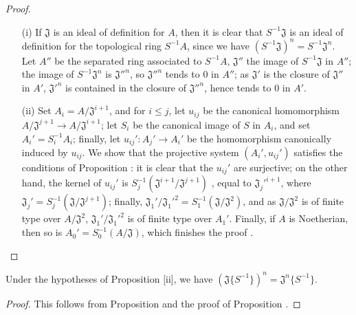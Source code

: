 \begin{proof}
\label{proof-7.6.11}
\medskip\noindent
\begin{enumerate}
  \item[(i)] If $\mathfrak{J}$ is an ideal of definition for $A$, then it is clear that
    $S^{-1}\mathfrak{J}$ is an ideal of definition for the topological ring $S^{-1}A$, since we
    have $(S^{-1}\mathfrak{J})^n=S^{-1}\mathfrak{J}^n$. Let $A''$ be the separated ring associated
    to $S^{-1}A$, $\mathfrak{J}''$ the image of $S^{-1}\mathfrak{J}$ in $A''$; the image of
    $S^{-1}\mathfrak{J}^n$ is ${\mathfrak{J}''}^n$, so ${\mathfrak{J}''}^n$ tends to $0$ in $A''$;
    as $\mathfrak{J}'$ is the closure of $\mathfrak{J}''$ in $A'$, ${\mathfrak{J}'}^n$ is contained
    in the closure of ${\mathfrak{J}''}^n$, hence tends to $0$ in $A'$.
  \item[(ii)] Set $A_i=A/\mathfrak{J}^{i+1}$, and for $i\leq j$, let $u_{ij}$ be the canonical
    homomorphism $A/\mathfrak{J}^{j+1}\to A/\mathfrak{J}^{i+1}$; let $S_i$ be the canonical image of
    $S$ in $A_i$, and set $A_i'=S_i^{-1}A_i$; finally, let $u_{ij}':A_j'\to A_i'$ be the homomorphism
    canonically induced by $u_{ij}$. We show that the projective system $(A_i',u_{ij}')$ satisfies
    the conditions of Proposition : it is clear that the $u_{ij}'$
    are surjective; on the other hand, the kernel of $u_{ij}'$ is
    $S_j^{-1}(\mathfrak{J}^{i+1}/\mathfrak{J}^{j+1})$ , equal to
    ${\mathfrak{J}_j'}^{i+1}$, where $\mathfrak{J}_j'=S_j^{-1}(\mathfrak{J}/\mathfrak{J}^{j+1})$;
    finally, $\mathfrak{J}_1'/{\mathfrak{J}_1'}^2=S_1^{-1}(\mathfrak{J}/\mathfrak{J}^2)$, and as
    $\mathfrak{J}/\mathfrak{J}^2$ is of finite type over $A/\mathfrak{J}^2$,
    $\mathfrak{J}_1'/{\mathfrak{J}_1'}^2$ is of finite type over $A_1'$. Finally, if $A$ is
    Noetherian, then so is $A_0'=S_0^{-1}(A/\mathfrak{J})$, which finishes the proof .
\end{enumerate}
\end{proof}

\begin{corollary}[7.6.12]
\label{0.7.6.12}
Under the hypotheses of Proposition [ii], we have
$(\mathfrak{J}\{S^{-1}\})^n=\mathfrak{J}^n\{S^{-1}\}$.
\end{corollary}

\begin{proof}
\label{proof-0.7.6.12}
This follows from Proposition  and the proof of
Proposition .
\end{proof}

